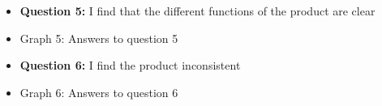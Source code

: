\documentclass{article}
\begin{document}
\begin{itemize}
		\item[] \textbf{Question 5:} I find that the different functions of the product are clear
		\item[] \begin{minipage}[t]{\linewidth}
         	 \raggedright
          	\medskip
          	\centerline{Graph 5: Answers to question 5}
          \end{minipage}
\end{itemize}
\newpage
\begin{itemize}
		\item[] \textbf{Question 6:} I find the product inconsistent
		\item[] \begin{minipage}[t]{\linewidth}
         	 \raggedright
          	\medskip
          	\centerline{Graph 6: Answers to question 6}
          \end{minipage}
\end{itemize}
\end{document}
